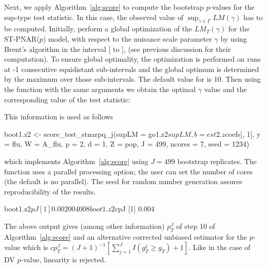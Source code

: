 Next, we apply Algorithm~\ref{alg:score} to compute the  bootstrap $p$-values for the sup-type test statistic. In this case, the observed value of $\sup_{\gamma\in\Gamma} LM(\gamma)$ has to be computed.  Initially, perform a global optimization of the $LM_T(\gamma)$ for the ST-PNAR($p$) model, with respect to the nuisance scale parameter $\gamma$ by using Brent's algorithm \citep{brent1972algorithms} in the interval [ to ],
(see previous discussion for their computation). To ensure global optimality, the optimization is performed on runs at -1 consecutive equidistant sub-intervals and the global optimum is determined by the maximum over those sub-intervals. The default value  for  is 10. Then using  the function  with the same arguments we obtain the  optimal $\gamma$ value and the corresponding value of the test statistic: 


\noindent
This information is used as follows

\begin{example}                  
	boot1.z2 <- score_test_stnarpq_j(supLM = go1.z2$supLM, b = est2.z$coefs[, 1], 
	y = flu, W = A_flu, p = 2, d = 1, Z = pop, 
	J = 499, ncores = 7, seed = 1234)
\end{example}

\noindent
which implements  Algorithm~\ref{alg:score} using $J =499$ bootstrap replicates. The function uses a parallel
processing  option; the user can set the number of cores  (the default is no parallel). The seed for random number generation  assures reproducibility of the results.

\begin{example}
	boot1.z2$pJ
	[1] 0.002004008
	boot1.z2$cpJ
	[1] 0.004
\end{example}

\noindent
The above output gives (among other information) $p^J_T$ of step 10 of Algorithm~\ref{alg:score}
and an alternative corrected unbiased estimator for the $p$-value  which is  $cp^J_T=(J+1)^{-1}\left[ \sum_{j=1}^{J}I(g^j_T\geq g_T)+1\right] $. Like in the case of DV $p$-value,  linearity is rejected.


